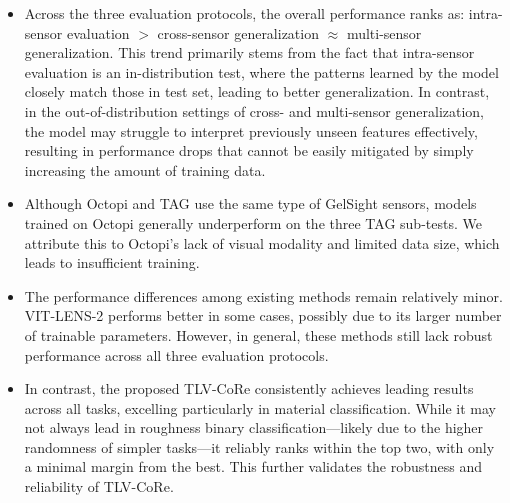 \documentclass[letterpaper]{article} %
\theoremstyle{definition}                %
\theoremstyle{plain}                     %
\theoremstyle{remark}                    %
\begin{document}
\begin{itemize}[leftmargin=*, itemsep=0pt, topsep=0pt]
    \item{Across the three evaluation protocols, the overall performance ranks as: intra-sensor evaluation $>$ cross-sensor generalization $\approx$ multi-sensor generalization. This trend primarily stems from the fact that intra-sensor evaluation is an in-distribution test, where the patterns learned by the model closely match those in test set, leading to better generalization. In contrast, in the out-of-distribution settings of cross- and multi-sensor generalization, the model may struggle to interpret previously unseen features effectively, resulting in performance drops that cannot be easily mitigated by simply increasing the amount of training data.}
    \item{Although Octopi and TAG use the same type of GelSight sensors, models trained on Octopi generally underperform on the three TAG sub-tests. We attribute this to Octopi's lack of visual modality and limited data size, which leads to insufficient training.}
    \item{The performance differences among existing methods remain relatively minor.  VIT-LENS-2 performs better in some cases, possibly due to its larger number of trainable parameters. However, in general, these methods still lack robust performance across all three evaluation protocols.}
    \item{In contrast, the proposed TLV-CoRe consistently achieves leading results across all tasks, excelling particularly in material classification. While it may not always lead in roughness binary classification—likely due to the higher randomness of simpler tasks—it reliably ranks within the top two, with only a minimal margin from the best. This further validates the robustness and reliability of TLV-CoRe.}
\end{itemize}
\end{document}
